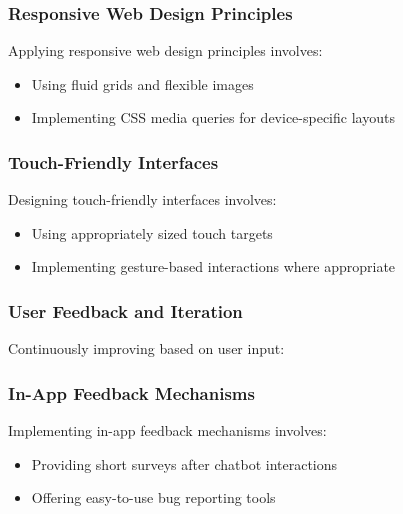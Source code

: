 \documentclass[14pt,a4paper]{article}
\begin{document}
\begin{multicols}{2}
\subsubsection{Responsive Web Design Principles}
Applying responsive web design principles \textit{\parencite[pp. 30-60]{Frain2023}} involves:
\begin{itemize}
    \item Using fluid grids and flexible images
    \item Implementing CSS media queries for device-specific layouts
\end{itemize}

\subsubsection{Touch-Friendly Interfaces}
Designing touch-friendly interfaces \textit{\parencite[pp. 80-120]{HooberBerkman2023}} involves:
\begin{itemize}
    \item Using appropriately sized touch targets
    \item Implementing gesture-based interactions where appropriate
\end{itemize}

\subsubsection{User Feedback and Iteration}
Continuously improving based on user input:



\subsubsection{In-App Feedback Mechanisms}
Implementing in-app feedback mechanisms \textit{\parencite[pp. 100-150]{TullisAlbert2024}} involves:
\begin{itemize}
    \item Providing short surveys after chatbot interactions
    \item Offering easy-to-use bug reporting tools
\end{itemize}


\end{multicols}
\end{document}
